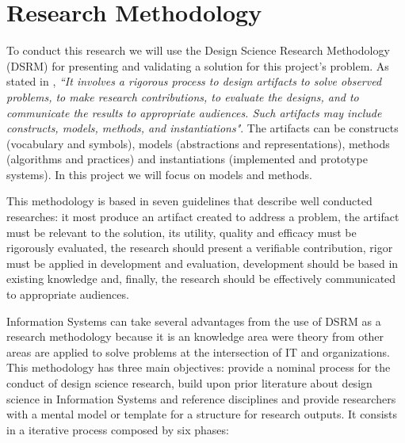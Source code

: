 
% 
% 

\section{Research Methodology}

To conduct this research we will use the Design Science Research Methodology (DSRM) \cite{DSRM} for presenting and validating a solution for this project's problem. As stated in \cite{DSRM}, \textit{``It involves a rigorous process to design artifacts to solve observed problems, to make research contributions, to evaluate the designs, and to communicate the results to appropriate audiences. Such artifacts may include constructs, models, methods, and instantiations"}. The artifacts can be constructs (vocabulary and symbols), models (abstractions and representations), methods (algorithms and practices) and instantiations (implemented and prototype systems). In this project we will focus on models and methods.\par
This methodology is based in seven guidelines that describe well conducted researches: it most produce an artifact created to address a problem, the artifact must be relevant to the solution, its utility, quality and efficacy must be rigorously evaluated, the research should present a verifiable contribution, rigor must be applied in development and evaluation, development should be based in existing knowledge and, finally, the research should be effectively communicated to appropriate audiences.\par
Information Systems can take several advantages from the use of DSRM as a research methodology because it is an knowledge area were theory from other areas are applied to solve problems at the intersection of IT and organizations.\cite{DSRM}
This methodology has three main objectives: provide a nominal process for the conduct of design science research, build upon prior literature about design science in Information Systems and reference disciplines and provide researchers with a mental model or template for a structure for research outputs. It consists in a iterative process composed by six phases:

